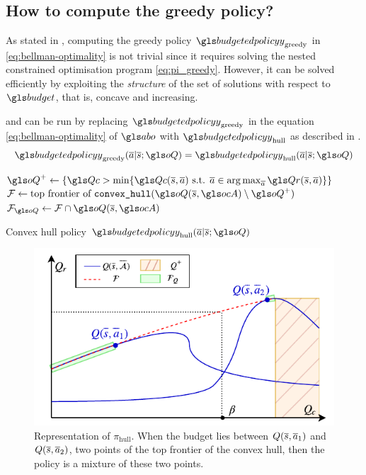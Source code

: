 \subsection{How to compute the greedy policy?}
\label{subsec:compute-greedy-policy}
As stated in , computing the greedy policy $\budgetedpolicy_\text{greedy}$ in \eqref{eq:bellman-optimality} is not trivial since it requires solving the nested constrained optimisation program \eqref{eq:pi_greedy}.
However, it can be solved efficiently by exploiting the \emph{structure} of the set of solutions with respect to $\budget$, that is, concave and increasing.

\begin{proposition}
	\label{prop:bftq_pi_hull}
	 and  can be run by replacing $\budgetedpolicy_\text{greedy}$ in the equation \eqref{eq:bellman-optimality} of $\abo$ with $\budgetedpolicy_\text{hull}$ as described in .
    \begin{equation*}
        \budgetedpolicy_\text{greedy}(\oa|\os; \oQ) = \budgetedpolicy_\text{hull}(\oa|\os; \oQ)
    \end{equation*}
\end{proposition}

\begin{algorithm}
	\DontPrintSemicolon
    $\oQ^+\leftarrow \{\Qc > \min \{\Qc(\os,\oa) \text{ s.t. }\oa\in\argmax_{\oa} \Qr(\os,\oa)\} \}$\;
    $\cF \leftarrow \text{top frontier of }\texttt{convex\_hull}(\oQ(\os,\ocA) \setminus \oQ^+)$\;
    $\cF_{\oQ} \leftarrow \cF\cap \oQ(\os,\ocA)$\;
    \caption{Convex hull policy $\budgetedpolicy_\text{hull}(\oa|\os; \oQ)$}
    \label{algo:pi_hull}
\end{algorithm}

\begin{figure}[ht]
	\centering
	\includegraphics[width=0.6\linewidth]{img/pi.pdf}
	\caption{Representation of $\pi_\text{hull}$. When the budget lies between $Q(\overline{s},\overline{a}_1)$ and $Q(\overline{s},\overline{a}_2)$, two points of the top frontier of the convex hull, then the policy is a mixture of these two points.}
	\label{fig:hull}
\end{figure}


